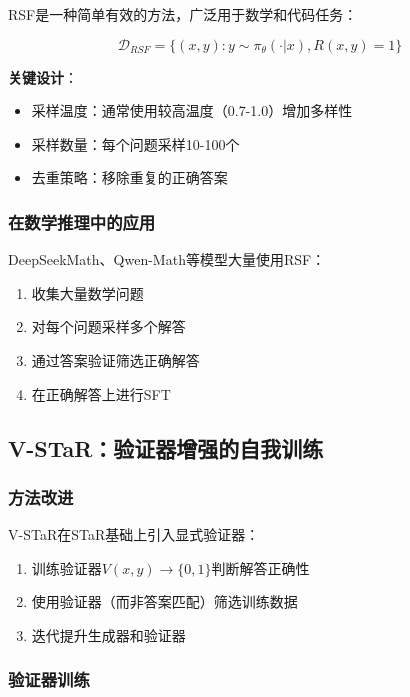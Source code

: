 \documentclass[12pt,a4paper]{article}
\begin{document}
RSF是一种简单有效的方法，广泛用于数学和代码任务：

\begin{equation}
\mathcal{D}_{RSF} = \{(x, y) : y \sim \pi_\theta(\cdot|x), R(x, y) = 1\}
\end{equation}

\textbf{关键设计}：
\begin{itemize}
    \item 采样温度：通常使用较高温度（0.7-1.0）增加多样性
    \item 采样数量：每个问题采样10-100个
    \item 去重策略：移除重复的正确答案
\end{itemize}

\subsubsection{在数学推理中的应用}

DeepSeekMath、Qwen-Math等模型大量使用RSF：
\begin{enumerate}
    \item 收集大量数学问题
    \item 对每个问题采样多个解答
    \item 通过答案验证筛选正确解答
    \item 在正确解答上进行SFT
\end{enumerate}

\subsection{V-STaR：验证器增强的自我训练}

\subsubsection{方法改进}

V-STaR在STaR基础上引入显式验证器：

\begin{enumerate}
    \item 训练验证器$V(x, y) \rightarrow \{0, 1\}$判断解答正确性
    \item 使用验证器（而非答案匹配）筛选训练数据
    \item 迭代提升生成器和验证器
\end{enumerate}

\subsubsection{验证器训练}
\end{document}
